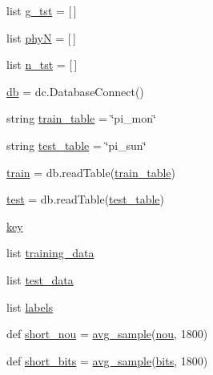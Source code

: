 \begin{DoxyCompactItemize}
\item 
list \mbox{\hyperlink{namespacetime__series2_a8ae6164c022bbafc01611a6801bc0f61}{g\+\_\+tst}} = \mbox{[}$\,$\mbox{]}
\item 
list \mbox{\hyperlink{namespacetime__series2_adcb42f8de34d804df871439dac54f26d}{phyN}} = \mbox{[}$\,$\mbox{]}
\item 
list \mbox{\hyperlink{namespacetime__series2_a6473b442b1cc4cbcfee1f06b95739529}{n\+\_\+tst}} = \mbox{[}$\,$\mbox{]}
\item 
\mbox{\hyperlink{namespacetime__series2_aa3dc64ee4f5d2e030faa61cfe845a994}{db}} = dc.\+Database\+Connect()
\item 
string \mbox{\hyperlink{namespacetime__series2_a34db5677db4e9381ee013b03a4e01231}{train\+\_\+table}} = \char`\"{}pi\+\_\+mon\char`\"{}
\item 
string \mbox{\hyperlink{namespacetime__series2_aae4b3d023bcc07d4610b83f328c9c817}{test\+\_\+table}} = \char`\"{}pi\+\_\+sun\char`\"{}
\item 
\mbox{\hyperlink{namespacetime__series2_a217725c41e0be8eff877ccf0738ca225}{train}} = db.\+read\+Table(\mbox{\hyperlink{namespacetime__series2_a34db5677db4e9381ee013b03a4e01231}{train\+\_\+table}})
\item 
\mbox{\hyperlink{namespacetime__series2_a1db23c9847b01280de0f7b35c02ec33d}{test}} = db.\+read\+Table(\mbox{\hyperlink{namespacetime__series2_aae4b3d023bcc07d4610b83f328c9c817}{test\+\_\+table}})
\item 
\mbox{\hyperlink{namespacetime__series2_a5eb1f8d582696414c5a074d2bdaeb4f5}{key}}
\item 
list \mbox{\hyperlink{namespacetime__series2_a19f3e3f5bd2694a9a461163b260e68a4}{training\+\_\+data}}
\item 
list \mbox{\hyperlink{namespacetime__series2_ac919557d9139430fa99c37bb9847b34a}{test\+\_\+data}}
\item 
list \mbox{\hyperlink{namespacetime__series2_aca78083d23e0850ea4120fa6817af6fb}{labels}}
\item 
def \mbox{\hyperlink{namespacetime__series2_a2675eebe825f166195eff20a30027b0b}{short\+\_\+nou}} = \mbox{\hyperlink{namespacetime__series2_a831b2ebbb3b93f1a189a11b798867bf2}{avg\+\_\+sample}}(\mbox{\hyperlink{namespacetime__series2_a97c4b20f0435fa06589a14b07d581ba4}{nou}}, 1800)
\item 
def \mbox{\hyperlink{namespacetime__series2_a1f91a36b8475489b7a12b6ade0010039}{short\+\_\+bits}} = \mbox{\hyperlink{namespacetime__series2_a831b2ebbb3b93f1a189a11b798867bf2}{avg\+\_\+sample}}(\mbox{\hyperlink{namespacetime__series2_af73dec23edfc91f6252482247ec3e77a}{bits}}, 1800)

\end{DoxyCompactItemize}
